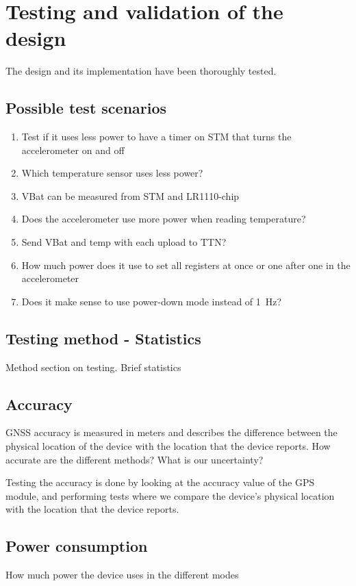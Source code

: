 \section{Testing and validation of the design } \label{sec:testing}

The design and its implementation have been thoroughly tested.

\subsection{Possible test scenarios}
\begin{enumerate}
    \item Test if it uses less power to have a timer on STM that turns the accelerometer on and off
    \item Which temperature sensor uses less power?
    \item VBat can be measured from STM and LR1110-chip
    \item Does the accelerometer use more power when reading temperature?
    \item Send VBat and temp with each upload to TTN?
    \item How much power does it use to set all registers at once or one after one in the accelerometer
    \item Does it make sense to use power-down mode instead of \SI{1}{\hertz}?
\end{enumerate}

\subsection{Testing method - Statistics}
Method section on testing. Brief statistics

\subsection{Accuracy}
\ac{GNSS} accuracy is measured in meters and describes the difference between the physical location of the device with the location that the device reports.
How accurate are the different methods? What is our uncertainty?

Testing the accuracy is done by looking at the accuracy value of the GPS module, and performing tests where we compare the device's physical location with the location that the device reports.

\subsection{Power consumption}
How much power the device uses in the different modes

